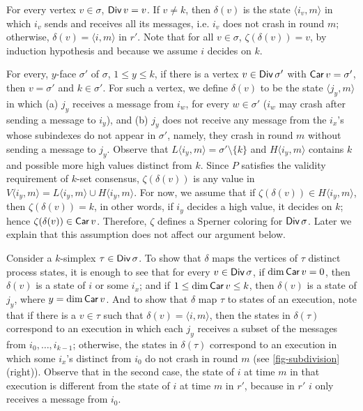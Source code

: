 \documentclass[11pt]{article}
\theoremstyle{definition}
\newcommand{\set}[1]{\{#1\}}
\DeclareMathOperator{\Car}{\sf Car}
\DeclareMathOperator{\Div}{\sf Div}
\newcommand{\ang}[1]{\langle{#1}\rangle}
\begin{document}
For every vertex $v \in \sigma$, $\Div v = v$.
If $v \neq k$, then $\delta(v)$ is the state $\ang{i_v,m}$ in which
$i_v$ sends and receives all its messages,
i.e. $i_v$ does not crash in round $m$;
otherwise, $\delta(v) = \ang{i,m}$ in $r'$.
Note that for all $v \in \sigma$, $\zeta(\delta(v)) = v$,
by induction hypothesis and because we assume $i$ decides on $k$.

For every, $y$-face $\sigma'$ of $\sigma$, $1 \leq y \leq k$,
if there is a vertex $v \in \Div \sigma'$ with $\Car v = \sigma'$,
then $v = \sigma'$ and $k \in \sigma'$.
For such a vertex, we define $\delta(v)$ to be the state $\ang{j_y,m}$ in which
(a) $j_y$ receives a message from $i_w$, for every $w \in \sigma'$
($i_w$ may crash after sending a message to $i_y$), and
(b) $j_y$ does not receive any message from the $i_{x}$'s whose
subindexes do not appear in $\sigma'$,
namely, they crash in round $m$
without sending a message to $j_y$.
Observe that $L\ang{i_y,m} = \sigma' \setminus \set{k}$
and $H\ang{i_y,m}$ contains $k$ and possible more high values distinct from $k$.
Since $P$ satisfies the validity requirement
of $k$-set consensus,
$\zeta(\delta(v))$ is any value in $V\ang{i_y,m} = L\ang{i_y,m} \cup H\ang{i_y,m}$.
For now, we assume that if $\zeta(\delta(v)) \in H\ang{i_y,m}$,
then $\zeta(\delta(v)) = k$, in other words,
if $i_y$ decides a high value, it decides on $k$;
hence $\zeta(\delta(v)) \in \Car v$.
Therefore, $\zeta$ defines a Sperner coloring for $\Div \sigma$.
Later we explain that this assumption does not affect our argument below.

Consider a $k$-simplex $\tau \in \Div \sigma$.
To show that $\delta$ maps the vertices of $\tau$
distinct process states, it is enough to see that
for every $v \in \Div \sigma$,
if $\dim \Car v = 0$, then $\delta(v)$ is a state of $i$ or some $i_x$;
and if $1 \leq \dim \Car v \leq k$,
then $\delta(v)$ is a state of $j_y$, where $y = \dim \Car v$.
And to show that $\delta$ map $\tau$ to states of an execution,
note that if there is a $v \in \tau$ such that
$\delta(v) = \ang{i,m}$, then
the states in $\delta(\tau)$
correspond to an execution in which
each $j_y$ receives a subset of the messages from
$i_0, \hdots, i_{k-1}$;
otherwise, the states in $\delta(\tau)$
correspond to an execution in which some
$i_x$'s distinct from $i_0$
do not crash in round $m$ (see \cref{fig-subdivision} (right)).
Observe that in the second case,
the state of $i$ at time $m$ in that execution is different from
the state of $i$ at time $m$ in $r'$, because in $r'$ $i$ only receives
a message from $i_0$.
\end{document}
